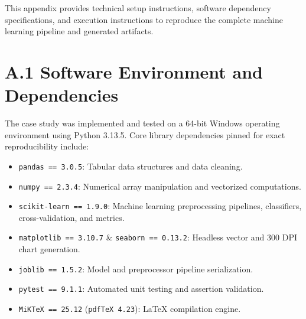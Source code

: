 \documentclass[12pt,a4paper]{report}
\begin{document}
This appendix provides technical setup instructions, software dependency specifications, and execution instructions to reproduce the complete machine learning pipeline and generated artifacts.

\section*{A.1 Software Environment and Dependencies}
The case study was implemented and tested on a 64-bit Windows operating environment using Python 3.13.5. Core library dependencies pinned for exact reproducibility include:
\begin{itemize}
    \item \texttt{pandas == 3.0.5}: Tabular data structures and data cleaning.
    \item \texttt{numpy == 2.3.4}: Numerical array manipulation and vectorized computations.
    \item \texttt{scikit-learn == 1.9.0}: Machine learning preprocessing pipelines, classifiers, cross-validation, and metrics.
    \item \texttt{matplotlib == 3.10.7} \& \texttt{seaborn == 0.13.2}: Headless vector and 300 DPI chart generation.
    \item \texttt{joblib == 1.5.2}: Model and preprocessor pipeline serialization.
    \item \texttt{pytest == 9.1.1}: Automated unit testing and assertion validation.
    \item \texttt{MiKTeX == 25.12} (\texttt{pdfTeX 4.23}): LaTeX compilation engine.
\end{itemize}
\end{document}
